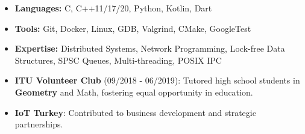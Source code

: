 \documentclass[a4paper,12pt]{memoir} %
\begin{document}
\begin{minipage}{\linewidth}
{\small
\begin{itemize}
\item \textbf{Languages:} C, C++11/17/20, Python, Kotlin, Dart
\item \textbf{Tools:} Git, Docker, Linux, GDB, Valgrind, CMake, GoogleTest
\item \textbf{Expertise:} Distributed Systems, Network Programming, Lock-free Data Structures, SPSC Queues, Multi-threading, POSIX IPC
\end{itemize}
}
\end{minipage}

{\small
\begin{itemize}
\item \textbf{ITU Volunteer Club} (09/2018 - 06/2019): Tutored high school students in \textbf{Geometry} and Math, fostering equal opportunity in education.
\item \textbf{IoT Turkey}: Contributed to business development and strategic partnerships.
\end{itemize}
}





\end{document}
